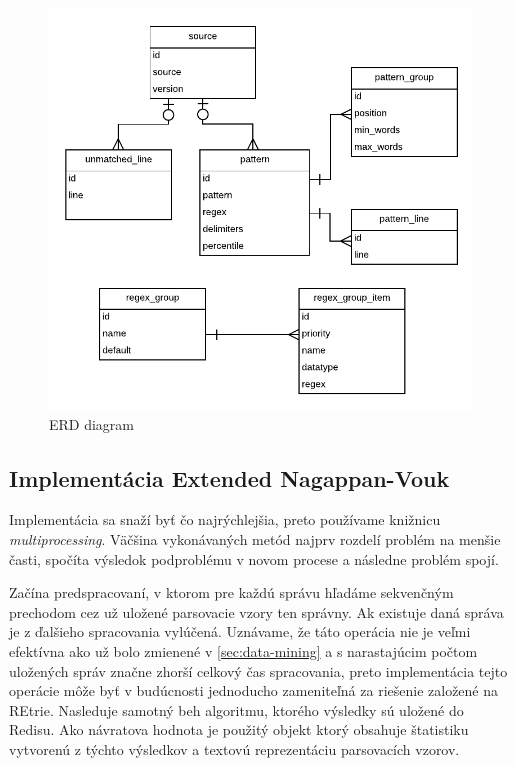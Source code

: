 \begin{figure}[htbp]
 \centering 
 \begin{minipage}{0.95\linewidth}
 	\centering
 	\includegraphics[width=\textwidth]{Images/thesis-erd.pdf}	
 \end{minipage}
  \caption{ERD diagram}
  \label{fig:use-cases}
\end{figure}

\subsection{Implementácia Extended Nagappan-Vouk}
Implementácia sa snaží byť čo najrýchlejšia, preto používame knižnicu \emph{multiprocessing}. Väčšina vykonávaných metód najprv rozdelí problém na menšie časti, spočíta výsledok podproblému v novom procese a následne problém spojí. 
\par  Začína predspracovaní, v ktorom pre každú správu hľadáme sekvenčným prechodom cez už uložené parsovacie vzory ten správny. Ak existuje daná správa je z ďalšieho spracovania vylúčená. Uznávame, že táto operácia nie je veľmi efektívna ako už bolo zmienené v \ref{sec:data-mining} a s narastajúcim počtom uložených správ značne zhorší celkový čas spracovania, preto implementácia tejto operácie môže byť v budúcnosti  jednoducho zameniteľná za riešenie založené na REtrie. Nasleduje samotný beh algoritmu, ktorého výsledky sú uložené do Redisu. Ako návratova hodnota je použitý objekt ktorý obsahuje štatistiku vytvorenú z týchto výsledkov a textovú reprezentáciu parsovacích vzorov.

